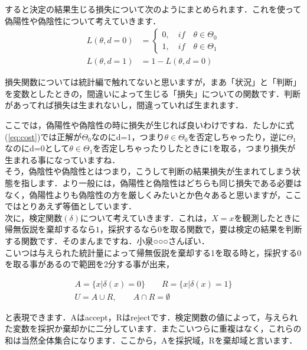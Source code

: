 \documentclass[11pt,a4paper,uplatex]{ujreport} 	%
\begin{document}
すると決定の結果生じる損失について次のようにまとめられます．これを使って偽陽性や偽陰性について考えていきます．\\


\begin{align}
  L(\theta, d=0) &= \left\{
    \begin{array}{l}
    0, \quad if \quad \theta \in \Theta_0\\
    1, \quad if \quad \theta \in \Theta_1
    \end{array}
  \right.\nonumber \\
  L(\theta, d=1) &= 1-L(\theta, d=0) 
  \label{eq:cost}
\end{align}

損失関数については統計編で触れてないと思いますが，まあ「状況」と「判断」を変数としたときの，間違いによって生じる「損失」についての関数です．判断があってれば損失は生まれないし，間違っていれば生まれます．

ここでは，偽陽性や偽陰性の時に損失が生じれば良いわけですね．たしかに式(\ref{eq:cost})では正解が$\Theta_0$なのにd=1，つまり$\theta \in \Theta_0$を否定しちゃったり，逆に$\Theta_1$なのにd=0として$\theta \in \Theta_1$を否定しちゃったりしたときに1を取る，つまり損失が生まれる事になっていますね．\\

そう，偽陰性や偽陰性とはつまり，こうして判断の結果損失が生まれてしまう状態を指します．より一般には，偽陽性と偽陰性はどちらも同じ損失である必要はなく，偽陽性よりも偽陰性の方を厳しくみたいとか色々あると思いますが，ここではとりあえず等価としています．\\

次に，検定関数$(\delta)$について考えていきます．これは，$X=x$を観測したときに帰無仮説を棄却するなら$1$，採択するなら$0$を取る関数で，要は検定の結果を判断する関数です．そのまんまですね．小泉○○○さんぽい．\\

こいつは与えられた統計量によって帰無仮説を棄却する1を取る時と，採択する0を取る事があるので範囲を2分する事が出来，

\begin{align}
  A = \{x| \delta(x) = 0\} \qquad R = \{x| \delta(x) = 1  \}\label{eq:test}\\
  U = A\cup R,\qquad A \cap R = \emptyset
\end{align}

と表現できます．Aはaccept，Rはrejectです．検定関数の値によって，与えられた変数を採択か棄却かに二分しています．またこいつらに重複はなく，これらの和は当然全体集合になります．ここから，Aを採択域，Rを棄却域と言います．\\
\end{document}
